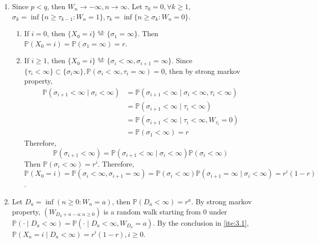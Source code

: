\documentclass[../main]{subfiles}
\begin{document}
\begin{solution}
  \begin{enumerate}
    \item Since \(p <q\), then \(W_n \to -\infty,n \to \infty\). Let \(\tau_0=0, \forall k \geq 1\),
      \(\sigma_k=\inf \{n \geq \tau_{k-1}:W_n=1\},\tau_k=\inf \{n \geq \sigma_k:W_n=0\}\).
      \begin{enumerate}
        \item If \(i=0\), then \(\{X_0=i\}\overset{\text{a.s.}}{=}\{\sigma_1=\infty\}\). Then \(\mathbb{P}(X_0=i)=\mathbb{P}(\sigma_1=\infty)=r\).
        \item If \(i \geq 1\), then \(\{X_0=i\}\overset{\text{a.s.}}{=}\{\sigma_i <\infty,\sigma_{i + 1}=\infty\}\).
          Since \(\{\tau_{i} <\infty\} \subset \{\sigma_{i} \infty\}, \mathbb{P}(\sigma_i <\infty, \tau_i = \infty)=0\),
          then by strong markov property,
          \[
            \begin{aligned}
              \mathbb{P}(\sigma_{i + 1} <\infty \mid \sigma_{i} < \infty) & = \mathbb{P}(\sigma_{i + 1} < \infty \mid \sigma_i <\infty, \tau_i < \infty) \\
                                                                          & =\mathbb{P}(\sigma_{i + 1}<\infty \mid \tau_i < \infty)                      \\
                                                                          & =\mathbb{P}(\sigma_{i + 1}< \infty \mid \tau_i < \infty, W_{\tau_i}=0)       \\
                                                                          & =\mathbb{P}(\sigma_1 < \infty)=r
            \end{aligned}
          \]
          Therefore,
          \[
            \mathbb{P}(\sigma_{i + 1} < \infty)=\mathbb{P}(\sigma_{i + 1}<\infty \mid \sigma_i < \infty )\mathbb{P}(\sigma_i < \infty)
          \]
          Then \(\mathbb{P}(\sigma_{i }<\infty)=r^i\).
          Therefore, \(\mathbb{P}(X_0=i)=\mathbb{P}(\sigma_i < \infty,\sigma_{i + 1}=\infty)=\mathbb{P}(\sigma_i < \infty) \mathbb{P}(\sigma_{i + 1}=\infty \mid \sigma_i < \infty)=r^i(1-r)\).
      \end{enumerate}
    \item Let \(D_a=\inf (n \geq 0: W_n=a)\), then \(\mathbb{P}(D_a < \infty)=r^a\). By strong markov property,
      \((W_{D_a + n-a:n \geq 0})\) is a random walk starting from \(0\) under \(\mathbb{P}(\cdot \mid D_a < \infty)=\mathbb{P}(\cdot \mid D_a < \infty, W_{D_a}=a)\).
      By the conclusion in \ref{ite:3.1}, \(\mathbb{P}(X_a=i \mid D_a < \infty)=r^i(1-r), i \geq 0\).

\end{enumerate}
\end{solution}
\end{document}
